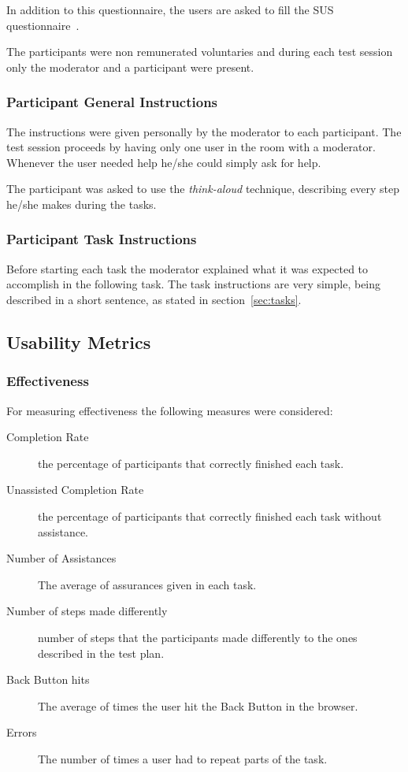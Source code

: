 \documentclass[a4paper]{article}
\begin{document}
In addition to this questionnaire, the users are asked to fill the SUS questionnaire~\citep{brooke1996sus}.

The participants were non remunerated voluntaries and during each test session only the moderator and a participant were present.

\subsubsection{Participant General Instructions}

The instructions were given personally by the moderator to each participant. The test session proceeds by having only one user in the room with a moderator. Whenever the user needed help he/she could simply ask for help.

The participant was asked to use the \textit{think-aloud} technique, describing every step he/she makes during the tasks.

\subsubsection{Participant Task Instructions}
Before starting each task the moderator explained what it was expected to accomplish in the following task. The task instructions are very simple, being described in a short sentence, as stated in section~\ref{sec:tasks}.

\subsection{Usability Metrics}
\label{sec:usability_metrics}

\subsubsection{Effectiveness}
For measuring effectiveness the following measures were considered:

\begin{description}
    
 \item[Completion Rate] the percentage of participants that correctly finished each task.
 \item[Unassisted Completion Rate] the percentage of participants that correctly finished each task without assistance.
 \item[Number of Assistances] The average of assurances given in each task.
 \item[Number of steps made differently] number of steps that the participants made differently to the ones described in the test plan.
 \item[Back Button hits] The average of times the user hit the Back Button in the browser.
 \item[Errors] The number of times a user had to repeat parts of the task.

\end{description} 
 
\end{document}
